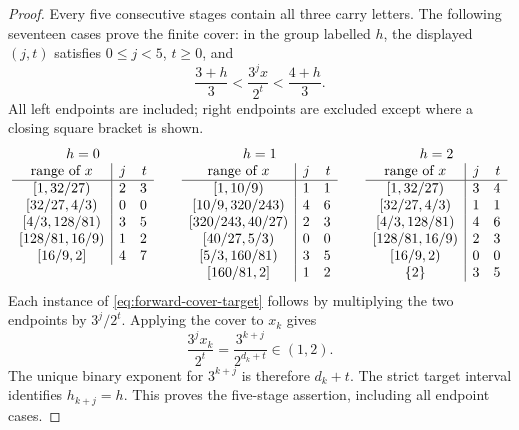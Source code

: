 \documentclass[11pt,a4paper]{article}
\begin{document}
\begin{proof}
Every five consecutive stages contain all three carry letters. The
following seventeen cases prove the finite cover: in the group labelled
$h$, the displayed $(j,t)$ satisfies $0\le j<5$, $t\ge0$, and
\begin{equation}\label{eq:forward-cover-target}
 \frac{3+h}{3}<\frac{3^j x}{2^t}<\frac{4+h}{3}.
\end{equation}
All left endpoints are included; right endpoints are excluded except
where a closing square bracket is shown.
\[
\begin{array}[t]{c|rr}
 \multicolumn{3}{c}{h=0}\\
 \text{range of }x&j&t\\ \hline
 {[1,32/27)} & 2 & 3\\
 {[32/27,4/3)} & 0 & 0\\
 {[4/3,128/81)} & 3 & 5\\
 {[128/81,16/9)} & 1 & 2\\
 {[16/9,2]} & 4 & 7
\end{array}
\qquad
\begin{array}[t]{c|rr}
 \multicolumn{3}{c}{h=1}\\
 \text{range of }x&j&t\\ \hline
 {[1,10/9)} & 1 & 1\\
 {[10/9,320/243)} & 4 & 6\\
 {[320/243,40/27)} & 2 & 3\\
 {[40/27,5/3)} & 0 & 0\\
 {[5/3,160/81)} & 3 & 5\\
 {[160/81,2]} & 1 & 2
\end{array}
\qquad
\begin{array}[t]{c|rr}
 \multicolumn{3}{c}{h=2}\\
 \text{range of }x&j&t\\ \hline
 {[1,32/27)} & 3 & 4\\
 {[32/27,4/3)} & 1 & 1\\
 {[4/3,128/81)} & 4 & 6\\
 {[128/81,16/9)} & 2 & 3\\
 {[16/9,2)} & 0 & 0\\
 {\{2\}} & 3 & 5
\end{array}
\]
Each instance of \eqref{eq:forward-cover-target} follows by multiplying
the two endpoints by $3^j/2^t$. Applying the cover to $x_k$ gives
\[
 \frac{3^j x_k}{2^t}=\frac{3^{k+j}}{2^{d_k+t}}\in(1,2).
\]
The unique binary exponent for $3^{k+j}$ is therefore $d_k+t$.
The strict target interval identifies $h_{k+j}=h$. This proves the
five-stage assertion, including all endpoint cases.


\end{proof}
\end{document}
